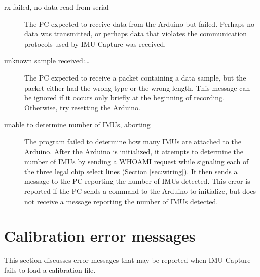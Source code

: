 \documentclass[11pt,letterpaper,article,oneside]{memoir}
\newcommand{\name}{IMU-Capture}
\begin{document}
\begin{description}
\item[rx failed, no data read from serial]
The PC expected to receive data from the Arduino but failed. Perhaps no data was
transmitted, or perhaps data that violates the communication protocols used by
\name{} was received.
\genericFix{}

\item[unknown sample received:\dots]
The PC expected to receive a packet containing a data sample, but the packet
either had the wrong type or the wrong length. This message can be ignored if it
occurs only briefly at the beginning of recording. Otherwise, try resetting the
Arduino.

\item[unable to determine number of IMUs, aborting]
The program failed to determine how many IMUs are attached to the Arduino. After
the Arduino is initialized, it attempts to determine the number of IMUs by
sending a WHOAMI request while signaling each of the three legal chip select
lines (Section \ref{sec:wiring}). It then sends a message to the PC reporting the
number of IMUs detected. This error is reported if the PC sends a
command to the Arduino to initialize, but does not receive a message reporting
the number of IMUs detected.
\genericFix{}

\end{description}

\section{Calibration error messages}
\label{sec:calibErrorMessages}

This section discusses error messages that may be reported when \name{} fails
to load a calibration file.
\end{document}
